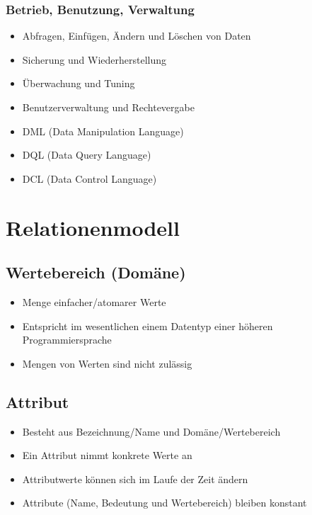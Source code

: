 \documentclass[8pt,a4paper]{scrartcl}
\begin{document}
\begin{multicols*}{3}
					\subsubsection{Betrieb, Benutzung, Verwaltung}
						\begin{itemize}\itemsep0pt			
							\item Abfragen, Einfügen, Ändern und Löschen von Daten
							\item Sicherung und Wiederherstellung
							\item Überwachung und Tuning
							\item Benutzerverwaltung und Rechtevergabe
							\item DML (Data Manipulation Language)
							\item DQL (Data Query Language)
							\item DCL (Data Control Language)
						\end{itemize}
						
						
		\section{Relationenmodell}
			\subsection{Wertebereich (Domäne)}
				\begin{itemize}\itemsep0pt			
					\item Menge einfacher/atomarer Werte
					\item Entspricht im wesentlichen einem Datentyp einer höheren Programmiersprache
					\item Mengen von Werten sind nicht zulässig
				\end{itemize}
					
			\subsection{Attribut}
				\begin{itemize}\itemsep0pt			
					\item Besteht aus Bezeichnung/Name und Domäne/Wertebereich
					\item Ein Attribut nimmt konkrete Werte an
					\item Attributwerte können sich im Laufe der Zeit ändern
					\item Attribute (Name, Bedeutung und Wertebereich) bleiben konstant
				\end{itemize}
					

\end{multicols*}
\end{document}
